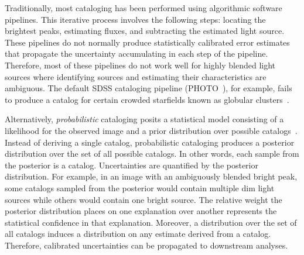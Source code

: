 
\bigbreak


Traditionally, most cataloging has been performed using algorithmic software pipelines.
This iterative process involves the following steps: locating the brightest peaks, estimating fluxes, and subtracting the estimated light source.
These pipelines do not normally produce statistically calibrated error estimates that propagate 
the uncertainty accumulating in each step of the pipeline. 
Therefore, most of these pipelines do not work well for highly blended light sources where identifying sources and estimating their characteristics are ambiguous. 
The default SDSS cataloging pipeline (PHOTO~\cite{lupton2001sdss}), for example, fails to 
produce a catalog for certain crowded starfields known as globular clusters~\cite{Portillo_2017}. 

Alternatively, {\itshape probabilistic} cataloging posits a statistical model consisting of a likelihood for the observed image and a prior distribution over possible catalogs~\cite{Brewer_2013, Portillo_2017, Feder_2019}. 
Instead of deriving a single catalog, probabilistic cataloging produces a posterior distribution over the set of all possible catalogs. 
In other words, each sample from the posterior is a catalog. 
Uncertainties are quantified by the posterior distribution. 
For example, in an image with an ambiguously blended bright peak, some catalogs sampled from the posterior would contain multiple dim light sources while others would contain one bright source. 
The relative weight the posterior distribution places on one explanation over another represents the statistical confidence in that explanation. 
Moreover, a distribution over the set of all catalogs induces a distribution on any estimate derived from a catalog. Therefore, calibrated uncertainties can be propagated to downstream analyses.  

